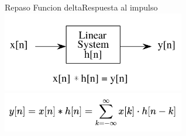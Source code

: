 \begin{frame}{Repaso Funcion delta}{Respuesta al impulso}
   \centering\includegraphics[width=0.6\textwidth]{4_clase/entrada_conv_h}\\
   \centering\includegraphics[width=0.6\textwidth]{4_clase/convolucion_eq}
   \vfill
\end{frame}
